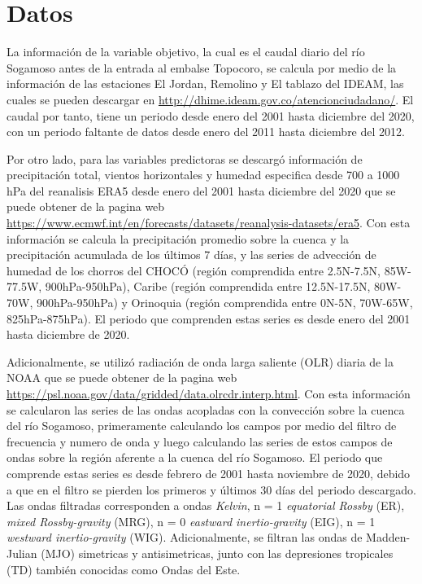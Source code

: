 \documentclass[draft]{agujournal2019}
\begin{document}
\section{Datos}

La información de la variable objetivo, la cual es el caudal diario del río Sogamoso antes de la entrada al embalse Topocoro, se calcula por medio de la información de las estaciones El Jordan, Remolino y El tablazo del IDEAM, las cuales se pueden descargar en \url{http://dhime.ideam.gov.co/atencionciudadano/}. El caudal por tanto, tiene un periodo desde enero del 2001 hasta diciembre del 2020, con un periodo faltante de datos desde enero del 2011 hasta diciembre del 2012.

Por otro lado, para las variables predictoras se descargó información de precipitación total, vientos horizontales y humedad especifica desde 700 a 1000 hPa del reanalisis ERA5 desde enero del 2001 hasta diciembre del 2020 que se puede obtener de la pagina web \url{https://www.ecmwf.int/en/forecasts/datasets/reanalysis-datasets/era5}. Con esta información se calcula la precipitación promedio sobre la cuenca y la precipitación acumulada de los últimos 7 días, y las series de advección de humedad de los chorros del CHOCÓ (región comprendida entre 2.5N-7.5N, 85W-77.5W, 900hPa-950hPa), Caribe (región comprendida entre 12.5N-17.5N, 80W-70W, 900hPa-950hPa) y Orinoquia (región comprendida entre 0N-5N, 70W-65W, 825hPa-875hPa). El periodo que comprenden estas series es desde enero del 2001 hasta diciembre de 2020.

Adicionalmente, se utilizó radiación de onda larga saliente (OLR) diaria de la NOAA que se puede obtener de la pagina web \url{https://psl.noaa.gov/data/gridded/data.olrcdr.interp.html}. Con esta información se calcularon las series de las ondas acopladas con la convección sobre la cuenca del río Sogamoso, primeramente calculando los campos por medio del filtro de frecuencia y numero de onda \cite{Wheeler_And_Kiladis_1999} y luego calculando las series de estos campos de ondas sobre la región aferente a la cuenca del río Sogamoso. El periodo que comprende estas series es desde febrero de 2001 hasta noviembre de 2020, debido a que en el filtro se pierden los primeros y últimos 30 días del periodo descargado. Las ondas filtradas corresponden a ondas \textit{Kelvin}, n = 1 \textit{equatorial Rossby} (ER), \textit{mixed Rossby-gravity} (MRG), n = 0 \textit{eastward inertio-gravity} (EIG), n = 1 \textit{westward inertio-gravity}  (WIG). Adicionalmente, se filtran las ondas de Madden-Julian (MJO) simetricas y antisimetricas, junto con las depresiones tropicales (TD) también conocidas como Ondas del Este.
\end{document}
